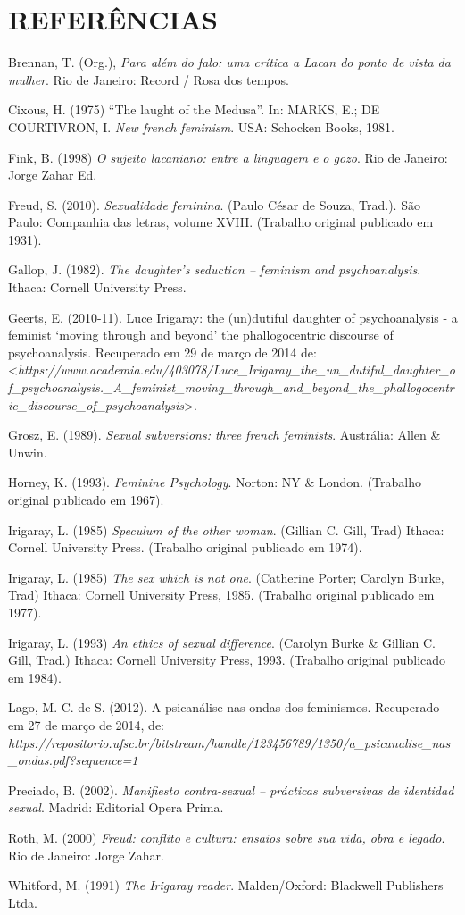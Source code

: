 \section{REFERÊNCIAS}

Brennan, T. (Org.), \emph{Para além do falo: uma crítica a Lacan do
ponto de vista da mulher}. Rio de Janeiro: Record / Rosa dos tempos.

Cixous, H. (1975) ``The laught of the Medusa''. In: MARKS, E.; DE
COURTIVRON, I. \emph{New french feminism}. USA: Schocken Books, 1981.

Fink, B. (1998) \emph{O sujeito lacaniano: entre a linguagem e o gozo}.
Rio de Janeiro: Jorge Zahar Ed.

Freud, S. (2010). \emph{Sexualidade feminina}. (Paulo César de Souza,
Trad.). São Paulo: Companhia das letras, volume XVIII. (Trabalho
original publicado em 1931).

Gallop, J. (1982). \emph{The daughter's seduction -- feminism and
psychoanalysis}. Ithaca: Cornell University Press.

Geerts, E. (2010-11). Luce Irigaray: the (un)dutiful daughter of
psychoanalysis - a feminist `moving through and beyond' the
phallogocentric discourse of psychoanalysis. Recuperado em 29 de março
de 2014 de:
\textless{}\emph{https://www.academia.edu/403078/Luce\_Irigaray\_the\_un\_dutiful\_daughter\_of\_psychoanalysis.\_A\_feminist\_moving\_through\_and\_beyond\_the\_phallogocentric\_discourse\_of\_psychoanalysis}\textgreater{}.

Grosz, E. (1989). \emph{Sexual subversions: three french feminists}.
Austrália: Allen \& Unwin.

Horney, K. (1993). \emph{Feminine Psychology}. Norton: NY \& London.
(Trabalho original publicado em 1967).

Irigaray, L. (1985) \emph{Speculum of the other woman}. (Gillian C.
Gill, Trad) Ithaca: Cornell University Press. (Trabalho original
publicado em 1974).

Irigaray, L. (1985) \emph{The sex which is not one}. (Catherine Porter;
Carolyn Burke, Trad) Ithaca: Cornell University Press, 1985. (Trabalho
original publicado em 1977).

Irigaray, L. (1993) \emph{An ethics of sexual difference}. (Carolyn
Burke \& Gillian C. Gill, Trad.) Ithaca: Cornell University Press, 1993.
(Trabalho original publicado em 1984).

Lago, M. C. de S. (2012). A psicanálise nas ondas dos feminismos.
Recuperado em 27 de março de 2014, de:
\emph{https://repositorio.ufsc.br/bitstream/handle/123456789/1350/a\_psicanalise\_nas\_ondas.pdf?sequence=1}

Preciado, B. (2002). \emph{Manifiesto contra-sexual -- prácticas
subversivas de identidad sexual}. Madrid: Editorial Opera Prima.

Roth, M. (2000) \emph{Freud: conflito e cultura: ensaios sobre sua vida,
obra e legado}. Rio de Janeiro: Jorge Zahar.

Whitford, M. (1991) \emph{The Irigaray reader}. Malden/Oxford: Blackwell
Publishers Ltda.
